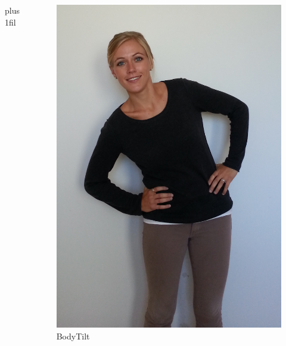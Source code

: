 \documentclass[xcolor=table]{beamer}
\makeatletter
\def\normaljustify{%
  \let\\\@centercr\rightskip\z@skip \leftskip\z@skip%
  \parfillskip=0pt plus 1fil}
\makeatother
\begin{document}
\begin{frame}
\begin{columns}[T]
\normaljustify
{}\begin{figure}
\includegraphics[scale=0.1]{images/mia_bodytilt.png}
\caption{BodyTilt}
\end{figure}

\end{columns}
\end{frame}
\end{document}
